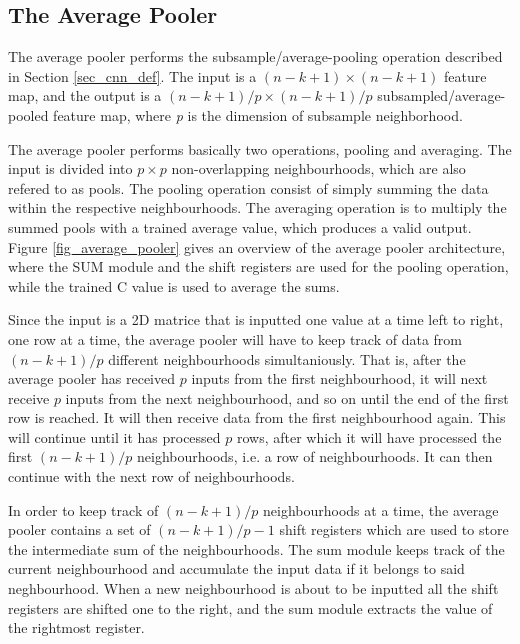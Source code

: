 \vspace*{1\baselineskip}


\subsection{The Average Pooler} \label{sec_average_pooler}

The average pooler performs the subsample/average-pooling operation described in Section \ref{sec_cnn_def}. The input is a $ (n-k+1) \times (n-k+1) $ feature map, and the output is a $ (n-k+1)/p \times (n-k+1)/p $ subsampled/average-pooled feature map, where \textit{p} is the dimension of subsample neighborhood. 

The average pooler performs basically two operations, pooling and averaging. The input is divided into $ p \times p $ non-overlapping neighbourhoods, which are also refered to as pools. The pooling operation consist of simply summing the data within the respective neighbourhoods. The averaging operation is to multiply the summed pools with a trained average value, which produces a valid output. Figure \ref{fig_average_pooler} gives an overview of the average pooler architecture, where the SUM module and the shift registers are used for the pooling operation, while the trained C value is used to average the sums. 

Since the input is a 2D matrice that is inputted one value at a time left to right, one row at a time, the average pooler will have to keep track of data from $(n-k+1)/p $ different neighbourhoods simultaniously. That is, after the average pooler has received $ p $ inputs from the first neighbourhood, it will next receive $ p $ inputs from the next neighbourhood, and so on until the end of the first row is reached. It will then receive data from the first neighbourhood again. This will continue until it has processed $ p $ rows, after which it will have processed the first $ (n-k+1)/p $ neighbourhoods, i.e. a row of neighbourhoods. It can then continue with the next row of neighbourhoods.

In order to keep track of $ (n-k+1)/p $ neighbourhoods at a time, the average pooler contains a set of $ (n-k+1)/p - 1 $ shift registers which are used to store the intermediate sum of the neighbourhoods. The sum module keeps track of the current neighbourhood and accumulate the input data if it belongs to said neghbourhood. When a new neighbourhood is about to be inputted all the shift registers are shifted one to the right, and the sum module extracts the value of the rightmost register. 


